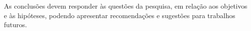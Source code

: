 
\chapter{}

As conclusões devem responder às questões da pesquisa, em relação aos 
objetivos e às hipóteses, podendo apresentar recomendações e sugestões para 
trabalhos futuros.
